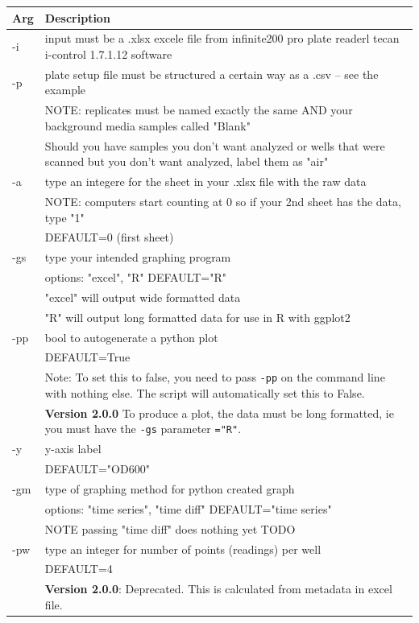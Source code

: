 \documentclass[12pt]{article}
\begin{document}
\begin{center}
\begin{xltabular}{\textwidth}{lX}
Arg & Description\\
\hline
-i & input must be a .xlsx excele file from infinite200 pro plate readerl tecan i-control 1.7.1.12 software\\
\hline
-p & plate setup file must be structured a certain way as a .csv -- see the example\\
 & NOTE: replicates must be named exactly the same AND your background media samples called "Blank"\\
 & Should you have samples you don't want analyzed or wells that were scanned but you don't want analyzed, label them as "air"\\
\hline
-a & type an integere for the sheet in your .xlsx file with the raw data\\
 & NOTE: computers start counting at 0 so if your 2nd sheet has the data, type "1"\\
 & DEFAULT=0 (first sheet)\\
\hline
-gs & type your intended graphing program\\
 & options: "excel", "R" DEFAULT="R"\\
 & "excel" will output wide formatted data\\
 & "R" will output long formatted data for use in R with ggplot2\\
\hline
-pp & bool to autogenerate a python plot\\
 & DEFAULT=True\\
 & Note: To set this to false, you need to pass \texttt{-pp} on the command line with nothing else. The script will automatically set this to False.\\
 & \textbf{Version 2.0.0} To produce a plot, the data must be long formatted, ie you must have the \texttt{-gs} parameter \texttt{="R"}.\\
\hline
-y & y-axis label\\
 & DEFAULT="OD600"\\
\hline
-gm & type of graphing method for python created graph\\
 & options: "time series", "time diff" DEFAULT="time series"\\
 & NOTE passing "time diff" does nothing yet TODO\\
\hline
-pw & type an integer for number of points (readings) per well\\
 & DEFAULT=4\\
 & \textbf{Version 2.0.0}: Deprecated. This is calculated from metadata in excel file.\\

\end{xltabular}
\end{center}
\end{document}
